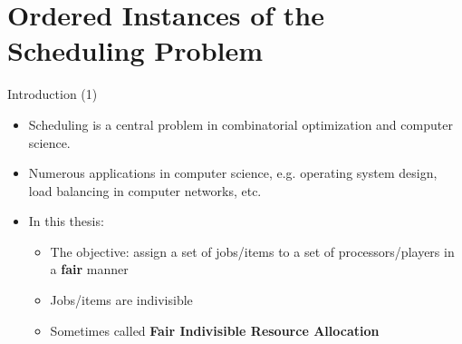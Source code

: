 \section{Ordered Instances of the Scheduling Problem}
\frame{\textbf{\insertsection}}


\begin{frame}[t]{Introduction (1)}
    \begin{itemize}
        \item<1-> Scheduling is a central problem in combinatorial optimization and computer science.
        \item<2-> Numerous applications in computer science, e.g. operating system design, load balancing in computer networks, etc.
        \item<3-> In this thesis:
            \begin{itemize}
                \item<4-> The objective: assign a set of jobs/items to a set of processors/players in a \textbf{fair} manner
                \item<5-> Jobs/items are indivisible
                \item<6-> Sometimes called \textbf{Fair Indivisible Resource Allocation}            
            \end{itemize}
    \end{itemize}
\end{frame}


